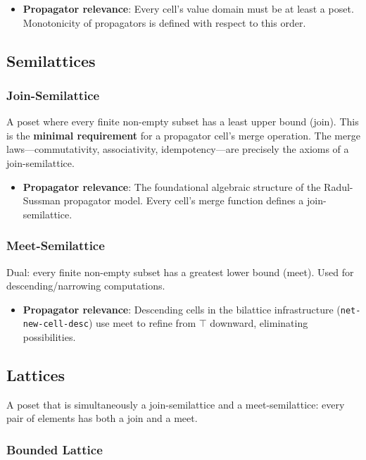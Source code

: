 \documentclass[11pt]{article}
\begin{document}
\begin{itemize}
\item \textbf{Propagator relevance}: Every cell's value domain must be at least a poset.
Monotonicity of propagators is defined with respect to this order.
\end{itemize}
\subsection{Semilattices}
\label{sec:org838ea51}

\subsubsection{Join-Semilattice}
\label{sec:orgaf66c80}

A poset where every finite non-empty subset has a least upper bound (join). This
is the \textbf{minimal requirement} for a propagator cell's merge operation. The merge
laws---commutativity, associativity, idempotency---are precisely the axioms of a
join-semilattice.

\begin{itemize}
\item \textbf{Propagator relevance}: The foundational algebraic structure of the Radul-Sussman
propagator model. Every cell's merge function defines a join-semilattice.
\end{itemize}
\subsubsection{Meet-Semilattice}
\label{sec:org3c4a735}

Dual: every finite non-empty subset has a greatest lower bound (meet). Used for
descending/narrowing computations.

\begin{itemize}
\item \textbf{Propagator relevance}: Descending cells in the bilattice infrastructure
(\texttt{net-new-cell-desc}) use meet to refine from \(\top\) downward, eliminating
possibilities.
\end{itemize}
\subsection{Lattices}
\label{sec:org8469b27}

A poset that is simultaneously a join-semilattice and a meet-semilattice: every
pair of elements has both a join and a meet.
\subsubsection{Bounded Lattice}
\label{sec:org7f23fc4}
\end{document}
